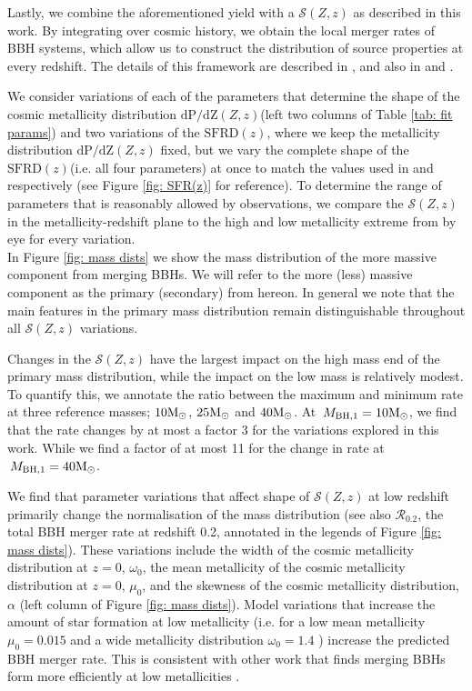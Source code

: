 \documentclass[twocolumn]{aastex631}
\newcommand{\Msun}{\ensuremath{\rm{M}_{\odot}}\xspace}
\newcommand{\Mbheen}{\ensuremath{\,M_{\rm BH, 1}}\xspace}
\newcommand{\SFRDzZ}{\ensuremath{\mathcal{S}(Z,z)}\xspace}
\newcommand{\SFRDz}{\ensuremath{\mathrm{SFRD}(z)}\xspace}
\newcommand{\dpdZ}{\ensuremath{\mathrm{dP/dZ}(Z,z)}\xspace}
\begin{document}
Lastly, we combine the aforementioned yield with a \SFRDzZ as described in this work. By integrating over cosmic history, we obtain the local merger rates of BBH systems, which allow us to construct the distribution of source properties at every redshift. The details of this framework are described in \cite{vanson+2022}, and also in \cite{Broekgaarden+2021a} and \cite{Neijssel+2019}. 

We consider variations of each of the parameters that determine the shape of the cosmic metallicity distribution \dpdZ (left two columns of Table \ref{tab: fit params}) and two variations of the \SFRDz, where we keep the metallicity distribution \dpdZ fixed, but we vary the complete shape of the \SFRDz (i.e. all four parameters) at once to match the values used in \cite{Madau+2017} and \cite{Neijssel2019} respectively (see Figure \ref{fig: SFR(z)} for reference). To determine the range of parameters that is reasonably allowed by observations, we compare the \SFRDzZ in the metallicity-redshift plane to the high and low metallicity extreme from \cite{Chruslinska+2021} by eye for every variation. \\


In Figure \ref{fig: mass dists} we show the mass distribution of the more massive component from merging BBHs. We will refer to the more (less) massive component as the primary (secondary) from hereon. 
In general we note that the main features in the primary mass distribution remain distinguishable throughout all \SFRDzZ variations. 


Changes in the \SFRDzZ have the largest impact on the high mass end of the primary mass distribution, while the impact on the low mass is relatively modest.
To quantify this, we annotate the ratio between the maximum and minimum rate at three reference masses; $10\Msun$, $25\Msun$ and $40\Msun$. 
At $\Mbheen=10\Msun$, we find that the rate changes by at most a factor 3 for the variations explored in this work. While we find a factor of at most 11 for the change in rate at $\Mbheen=40\Msun$. 


We find that parameter variations that affect shape of \SFRDzZ at low redshift primarily change the normalisation of the mass distribution (see also  $\mathcal{R}_{0.2}$, the total BBH merger rate at redshift 0.2, annotated in the legends of Figure \ref{fig: mass dists}). 
These variations include the width of the cosmic metallicity distribution at $z=0$, $\omega_0$, the mean metallicity of the cosmic metallicity distribution at $z=0$, $\mu_0$, and the skewness of the cosmic metallicity distribution, $\alpha$ (left column of Figure \ref{fig: mass dists}).
Model variations that increase the amount of star formation at low metallicity (i.e. for a low mean metallicity $\mu_0=0.015$ and a wide metallicity distribution $\omega_0 = 1.4$ ) increase the predicted BBH merger rate. This is consistent with other work that finds merging BBHs form more efficiently at low metallicities \citep[e.g.][]{BelczynskiVink2010, Stevenson+2017,Mapelli2017,Chruslinska2019_effectCO,Broekgaarden+2021b}.
\end{document}
